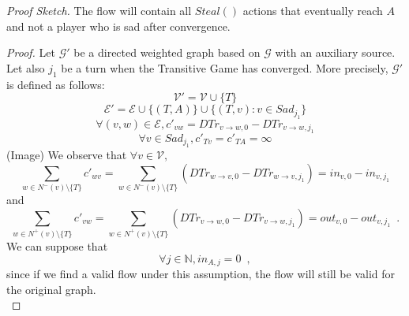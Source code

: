 \documentclass[11pt]{llncs}
\newenvironment{proofsketch}{\textit{Proof Sketch.}}{}
\begin{document}
    \begin{proofsketch}
       The flow will contain all $Steal\left(\right)$ actions that eventually reach $A$ and not a player who is sad after
       convergence.
    \end{proofsketch}
    \begin{proof}
       Let $\mathcal{G}'$ be a directed weighted graph based on $\mathcal{G}$ with an auxiliary source. Let also $j_1$ be a
       turn when the Transitive Game has converged. More precisely, $\mathcal{G}'$ is defined as follows:
       \begin{equation}
          \mathcal{V}' = \mathcal{V} \cup \{T\}
       \end{equation}
       \begin{equation}
          \mathcal{E}' = \mathcal{E} \cup \{(T, A)\} \cup \{(T, v) : v \in Sad_{j_1}\}
       \end{equation}
       \begin{equation}
          \forall (v, w) \in \mathcal{E}, c'_{vw} = DTr_{v \rightarrow w, 0} - DTr_{v \rightarrow w, j_1}
       \end{equation}
       \begin{equation}
          \forall v \in Sad_{j_1}, c'_{Tv} = c'_{TA} = \infty
       \end{equation}
       (Image)
       We observe that $\forall v \in \mathcal{V},$
       \begin{equation}
       \label{gameflowin}
          \sum\limits_{w \in N^{-}\left(v\right) \setminus \{T\}}c'_{wv} = \sum\limits_{w \in
          N^{-}\left(v\right) \setminus \{T\}}\left(DTr_{w \rightarrow v, 0} - DTr_{w \rightarrow v, j_1}\right) = in_{v, 0}
          - in_{v, j_1}
       \end{equation}
       and
       \begin{equation}
       \label{gameflowout}
          \sum\limits_{w \in N^{+}\left(v\right) \setminus \{T\}}c'_{vw} = \sum\limits_{w \in N^{+}\left(v\right) \setminus
          \{T\}}\left(DTr_{v \rightarrow w, 0} - DTr_{v \rightarrow w, j_1}\right) = out_{v, 0} - out_{v, j_1} \enspace.
       \end{equation}
       We can suppose that
       \begin{equation}
       \label{Aincoming}
          \forall j \in \mathbb{N}, in_{A, j} = 0 \enspace,
       \end{equation}
       since if we find a valid flow under this assumption, the flow will still be valid for the original graph. \\

\end{proof}
\end{document}

